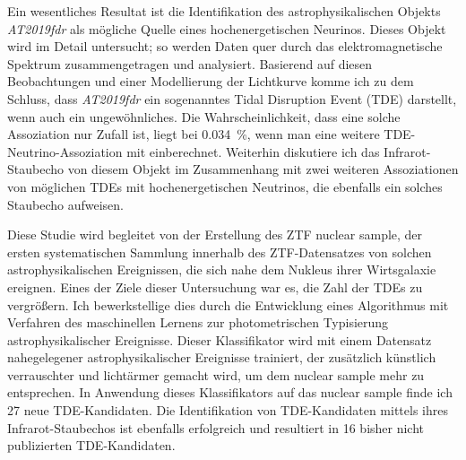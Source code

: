 Ein wesentliches Resultat ist die Identifikation des astrophysikalischen Objekts \textit{AT2019fdr} als mögliche Quelle eines hochenergetischen Neurinos. Dieses Objekt wird im Detail untersucht; so werden Daten quer durch das elektromagnetische Spektrum zusammengetragen und analysiert. Basierend auf diesen Beobachtungen und einer Modellierung der Lichtkurve komme ich zu dem Schluss, dass \textit{AT2019fdr} ein sogenanntes Tidal Disruption Event (TDE) darstellt, wenn auch ein ungewöhnliches. Die Wahrscheinlichkeit, dass eine solche Assoziation nur Zufall ist, liegt bei \SI{0.034}{\percent}, wenn man eine weitere TDE-Neutrino-Assoziation mit einberechnet. Weiterhin diskutiere ich das Infrarot-Staubecho von diesem Objekt im Zusammenhang mit zwei weiteren Assoziationen von möglichen TDEs mit hochenergetischen Neutrinos, die ebenfalls ein solches Staubecho aufweisen.

Diese Studie wird begleitet von der Erstellung des ZTF nuclear sample, der ersten systematischen Sammlung innerhalb des ZTF-Datensatzes von solchen astrophysikalischen Ereignissen, die sich nahe dem Nukleus ihrer Wirtsgalaxie ereignen. Eines der Ziele dieser Untersuchung war es, die Zahl der TDEs zu vergrößern. Ich bewerkstellige dies durch die Entwicklung eines Algorithmus mit Verfahren des maschinellen Lernens zur photometrischen Typisierung astrophysikalischer Ereignisse. Dieser Klassifikator wird mit einem Datensatz nahegelegener astrophysikalischer Ereignisse trainiert, der zusätzlich künstlich verrauschter und lichtärmer gemacht wird, um dem nuclear sample mehr zu entsprechen. In Anwendung dieses Klassifikators auf das nuclear sample finde ich 27 neue TDE-Kandidaten. Die Identifikation von TDE-Kandidaten mittels ihres Infrarot-Staubechos ist ebenfalls erfolgreich und resultiert in 16 bisher nicht publizierten TDE-Kandidaten.